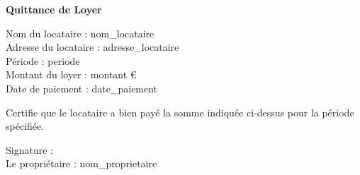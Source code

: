 \documentclass{article}
\begin{document}
\begin{center}
    \Large\textbf{Quittance de Loyer}
\end{center}

\noindent
Nom du locataire : {{nom_locataire}} \\
Adresse du locataire : {{adresse_locataire}} \\
Période : {{periode}} \\
Montant du loyer : {{montant}} € \\
Date de paiement : {{date_paiement}} \\

\vspace{1cm}

\noindent
Certifie que le locataire a bien payé la somme indiquée ci-dessus pour la période spécifiée.

\vspace{2cm}

\noindent
Signature : \\
Le propriétaire : {{nom_proprietaire}}
\end{document}
